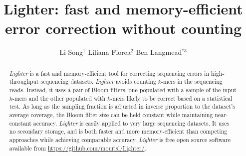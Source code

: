 \documentclass[10pt]{article}
\begin{document}

\title{Lighter: fast and memory-efficient error correction without counting}



\author{Li Song$^1$
  Liliana Florea$^2$
  Ben Langmead$^{*3}$
}


\maketitle



\begin{abstract}
\emph{Lighter} is a fast and memory-efficient tool for correcting sequencing errors in high-throughput sequencing datasets.
\emph{Lighter} avoids counting $k$-mers in the sequencing reads.
Instead, it uses a pair of Bloom filters, one populated with a sample of the input $k$-mers and the other populated with $k$-mers likely to be correct based on a statistical test.
As long as the sampling fraction is adjusted in inverse proportion to the dataset's average coverage, the Bloom filter size can be held constant while maintaining near-constant accuracy.
\emph{Lighter} is easily applied to very large sequencing datasets.  It uses no secondary storage, and is both faster and more memory-efficient than competing approaches while achieving comparable accuracy.
\emph{Lighter} is free open source software available from \url{https://github.com/mourisl/Lighter/}.
\end{abstract}
\end{document}
